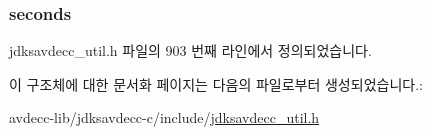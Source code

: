 \subsubsection[{\texorpdfstring{seconds}{seconds}}]{ seconds}\hypertarget{structjdksavdecc__gptp__seconds_aae1213f8226839b7226bcbfb6f1e568d}{}\label{structjdksavdecc__gptp__seconds_aae1213f8226839b7226bcbfb6f1e568d}


jdksavdecc\+\_\+util.\+h 파일의 903 번째 라인에서 정의되었습니다.



이 구조체에 대한 문서화 페이지는 다음의 파일로부터 생성되었습니다.\+:\begin{DoxyCompactItemize}
\item 
avdecc-\/lib/jdksavdecc-\/c/include/\hyperlink{jdksavdecc__util_8h}{jdksavdecc\+\_\+util.\+h}\end{DoxyCompactItemize}

